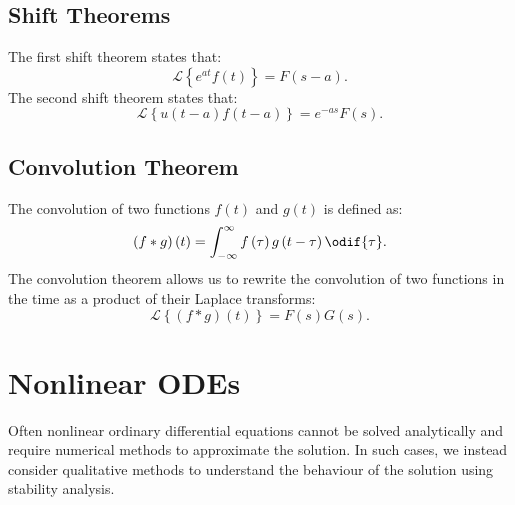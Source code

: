 \documentclass{article}
\begin{document}
\subsection{Shift Theorems}
The first shift theorem states that:
\begin{equation*}
    \mathscr{L}\left\{ e^{at} f\left( t \right) \right\} = F\left( s - a \right).
\end{equation*}
The second shift theorem states that:
\begin{equation*}
    \mathscr{L}\left\{ u\left( t - a \right) f\left( t - a \right) \right\} = e^{-as} F\left( s \right).
\end{equation*}
\subsection{Convolution Theorem}
The convolution of two functions \(f\left( t \right)\) and \(g\left( t
\right)\) is defined as:
\begin{equation*}
    \left( f * g \right)\left( t \right) = \int_{-\infty}^\infty f\left( \tau \right) g\left( t - \tau \right) \odif{\tau}.
\end{equation*}
The convolution theorem allows us to rewrite the convolution of two
functions in the time as a product of their Laplace transforms:
\begin{equation*}
    \mathscr{L}\left\{ \left( f * g \right)\left( t \right) \right\} = F\left( s \right) G\left( s \right).
\end{equation*}
\section{Nonlinear ODEs}
Often nonlinear ordinary differential equations cannot be solved
analytically and require numerical methods to approximate the solution.
In such cases, we instead consider qualitative methods to understand
the behaviour of the solution using stability analysis.
\end{document}
